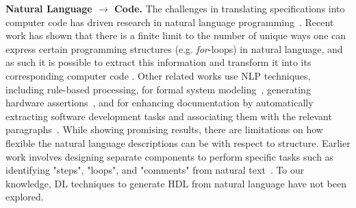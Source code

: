 \textbf{Natural Language $\rightarrow$ Code.}
The challenges in translating specifications into computer code has driven research in natural language programming~\cite{mihalcea2006nlp}. %
%
Recent work has shown that there is a finite limit to the number of unique ways one can express certain programming structures (e.g. \emph{for}-loops) in natural language, and as such it is possible to extract this information and transform it into its corresponding computer code \cite{mihalcea2006nlp}. 
Other related works use \ac{NLP} techniques, including rule-based processing, for formal system modeling~\cite{drechsler2012generating},
generating hardware assertions~\cite{harris2016glast}, and for enhancing documentation by automatically extracting software development tasks and associating them with the relevant paragraphs~\cite{treude_extracting_2015}. 
While showing promising results, there are limitations on how flexible the natural language descriptions can be with respect to structure. 
Earlier work involves designing separate components to perform specific tasks such as identifying "steps", "loops", and "comments" from natural text~\cite{mihalcea2006nlp}. 
To our knowledge, \ac{DL} techniques to generate \ac{HDL} from natural language have not been explored. %














